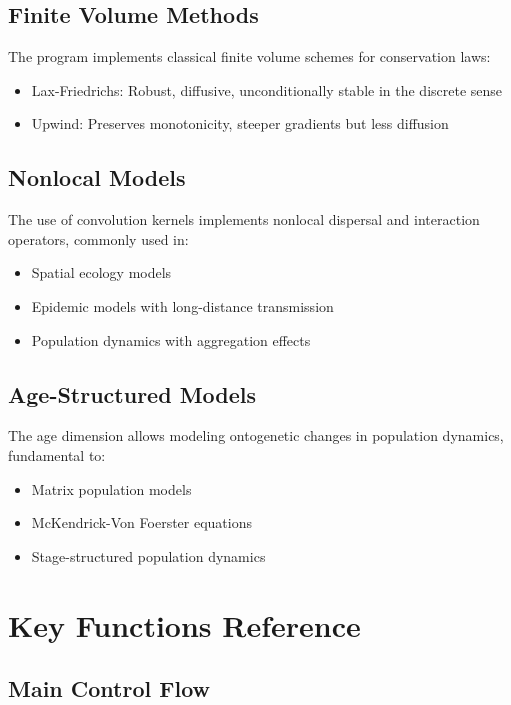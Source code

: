 \documentclass[12pt,a4paper]{report}
\begin{document}
\section{Finite Volume Methods}

The program implements classical finite volume schemes for conservation laws:

\begin{itemize}
    \item Lax-Friedrichs: Robust, diffusive, unconditionally stable in the discrete sense
    \item Upwind: Preserves monotonicity, steeper gradients but less diffusion
\end{itemize}

\section{Nonlocal Models}

The use of convolution kernels implements nonlocal dispersal and interaction operators, commonly used in:

\begin{itemize}
    \item Spatial ecology models
    \item Epidemic models with long-distance transmission
    \item Population dynamics with aggregation effects
\end{itemize}

\section{Age-Structured Models}

The age dimension allows modeling ontogenetic changes in population dynamics, fundamental to:

\begin{itemize}
    \item Matrix population models
    \item McKendrick-Von Foerster equations
    \item Stage-structured population dynamics
\end{itemize}

\appendix

\chapter{Key Functions Reference}

\section{Main Control Flow}
\end{document}

